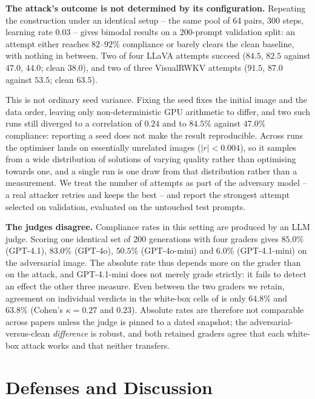 \documentclass[conference]{IEEEtran}
\newcommand{\tabcap}[1]{\caption{\normalfont #1}}
\begin{document}
\textbf{The attack's outcome is not determined by its configuration.}
Repeating the construction under an identical setup -- the same pool of 64
pairs, 300 steps, learning rate $0.03$ -- gives bimodal results on a
200-prompt validation split: an attempt either reaches $82$--$92\%$
compliance or barely clears the clean baseline, with nothing in between. Two
of four LLaVA attempts succeed ($84.5$, $82.5$ against $47.0$, $44.0$; clean
$38.0$), and two of three VisualRWKV attempts ($91.5$, $87.0$ against
$53.5$; clean $63.5$).

This is not ordinary seed variance. Fixing the seed fixes the initial image
and the data order, leaving only non-deterministic GPU arithmetic to differ,
and two such runs still diverged to a correlation of $0.24$ and to $84.5\%$
against $47.0\%$ compliance: reporting a seed does not make the result
reproducible. Across runs the optimiser lands on essentially unrelated
images ($|r|<0.004$), so it samples from a wide distribution of solutions of
varying quality rather than optimising towards one, and a single run is one
draw from that distribution rather than a measurement. We treat the number of attempts as part of the adversary
model -- a real attacker retries and keeps the best -- and report the
strongest attempt selected on validation, evaluated on the untouched test
prompts.

\textbf{The judges disagree.} Compliance rates in this setting are produced
by an LLM judge. Scoring one identical set of 200 generations with four
graders gives $85.0\%$ (GPT-4.1), $83.0\%$ (GPT-4o), $50.5\%$ (GPT-4o-mini)
and $6.0\%$ (GPT-4.1-mini) on the adversarial image. The absolute rate thus
depends more on the grader than on the attack, and GPT-4.1-mini does not
merely grade strictly: it fails to detect an effect the other three measure. Even between the two graders we retain, agreement on
individual verdicts in the white-box cells of  is only
$64.8\%$ and $63.8\%$ (Cohen's $\kappa=0.27$ and $0.23$). Absolute rates are
therefore not comparable across papers unless the judge is pinned to a
dated snapshot; the adversarial-versus-clean \emph{difference} is robust,
and both retained graders agree that each white-box attack works and that
neither transfers.

\section{Defenses and Discussion}

\begin{table}[t]
  \centering
  \tabcap{Input transformations at the pipeline boundary. Imagenette: LLaVA
  clean accuracy and targeted success of the encoder-level attack (256
  images, $\epsilon=0.03$, prompt A). SafeRLHF: compliance rate with a clean
  and with the adversarial image.}
  \label{tab:defense}
  \footnotesize
  
\end{table}
\end{document}
